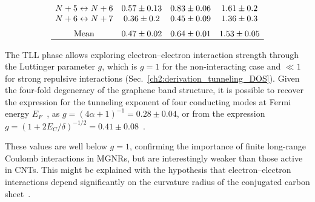 \begin{table}
\[\begin{array}{cccc}
            N+5\leftrightarrow N+6 & 0.57 \pm 0.13                             & 0.83 \pm 0.06                            & 1.61 \pm 0.2                                                 \\
            N+6\leftrightarrow N+7 & 0.36 \pm 0.2                              & 0.45 \pm 0.09                            & 1.36 \pm 0.3                                                 \\
            \textrm{Mean}          & 0.47 \pm 0.02                             & 0.64 \pm 0.01                            & 1.53 \pm 0.05                                        \Tsmall \\
            \hline
        \end{array}
    \]
\end{table}
%
The \gls{TLL} phase allows exploring electron--electron interaction strength through the Luttinger parameter $g$, which is $g=1$ for the non-interacting case and $\ll 1$ for strong repulsive interactions (Sec.~\ref{ch2:derivation_tunneling_DOS}). Given the four-fold degeneracy of the graphene band structure, it is possible to recover the expression for the tunneling exponent of four conducting modes at Fermi energy $E_F$~\cite{bockrath1999luttinger}, as $g=(4 \alpha+1)^{-1}=0.28 \pm 0.04$, or from the expression $g=\left(1+2 E_C / \delta\right)^{-1 / 2}=0.41 \pm 0.08$~\cite{egger1997effective, egger1999luttinger}.

These values are well below $g=1$, confirming the importance of finite long-range Coulomb interactions in \glspl{MGNR}, but are interestingly weaker than those active in \glspl{CNT}. This might be explained with the hypothesis that electron--electron interactions depend significantly on the curvature radius of the conjugated carbon sheet~\cite{laird2015quantum,kane1997coulomb}.


